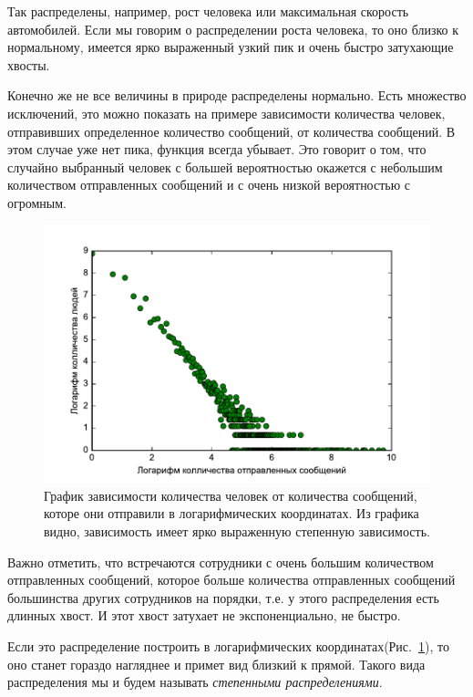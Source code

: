 Так распределены, например, рост человека или максимальная скорость автомобилей. Если мы говорим о распределении роста человека, то оно близко к нормальному, имеется ярко выраженный узкий пик и очень быстро затухающие хвосты. 


Конечно же не все величины в природе распределены нормально. Есть множество исключений, это можно показать на примере зависимости количества человек, отправивших определенное количество сообщений, от количества сообщений. В этом случае уже нет пика, функция всегда убывает. Это говорит о том, что случайно выбранный человек с большей вероятностью окажется с небольшим количеством отправленных сообщений и с очень низкой вероятностью с огромным. 

\begin{figure}[H]
 \includegraphics{recources/enron/mailes_by_people_enron}
 \caption{График зависимости количества человек от количества сообщений, которе они отправили в логарифмических координатах. Из графика видно, зависимость имеет ярко выраженную степенную зависимость.}
 \label{fig:enron_mails_by_people}
\end{figure}

Важно отметить, что встречаются сотрудники с очень большим количеством отправленных сообщений, которое больше количества отправленных сообщений большинства других сотрудников на порядки, т.е. у этого распределения есть длинных хвост. И этот хвост затухает не экспоненциально, не быстро. 

Если это распределение построить в логарифмических координатах(Рис.~\ref{fig:enron_mails_by_people}), то оно станет гораздо нагляднее и примет вид близкий к прямой. Такого вида распределения мы и будем называть \textit{степенными распределениями}. 

